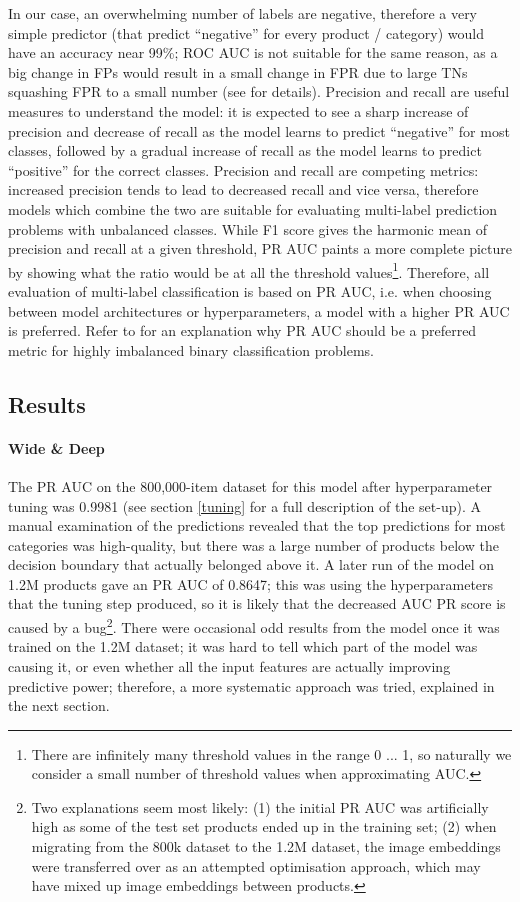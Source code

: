 In our case, an overwhelming number of labels are negative, therefore a very simple predictor (that predict ``negative'' for every product / category) would have an accuracy near 99\%; ROC AUC is not suitable for the same reason, as a big change in FPs would result in a small change in FPR due to large TNs squashing FPR to a small number (see \cite{prauc} for details).
Precision and recall are useful measures to understand the model: it is expected to see a sharp increase of precision and decrease of recall as the model learns to predict ``negative'' for most classes, followed by a gradual increase of recall as the model learns to predict ``positive'' for the correct classes.
Precision and recall are competing metrics: increased precision tends to lead to decreased recall and vice versa, therefore models which combine the two are suitable for evaluating multi-label prediction problems with unbalanced classes.
While F1 score gives the harmonic mean of precision and recall at a given threshold, PR AUC paints a more complete picture by showing what the ratio would be at all the threshold values\footnote{There are infinitely many threshold values in the range 0 ... 1, so naturally we consider a small number of threshold values when approximating AUC.}.
Therefore, all evaluation of multi-label classification is based on PR AUC, i.e. when choosing between model architectures or hyperparameters, a model with a higher PR AUC is preferred.
Refer to \cite{prauc} for an explanation why PR AUC should be a preferred metric for highly imbalanced binary classification problems.

\subsection{Results}


\paragraph{Wide \& Deep}
The PR AUC on the 800,000-item dataset for this model after hyperparameter tuning was 0.9981 (see section \ref{tuning} for a full description of the set-up).
A manual examination of the predictions revealed that the top predictions for most categories was high-quality, but there was a large number of products below the decision boundary that actually belonged above it.
A later run of the model on 1.2M products gave an PR AUC of 0.8647; this was using the hyperparameters that the tuning step produced, so it is likely that the decreased AUC PR score is caused by a bug\footnote{Two explanations seem most likely: (1) the initial PR AUC was artificially high as some of the test set products ended up in the training set; (2) when migrating from the 800k dataset to the 1.2M dataset, the image embeddings were transferred over as an attempted optimisation approach, which may have mixed up image embeddings between products.}.
There were occasional odd results from the model once it was trained on the 1.2M dataset; it was hard to tell which part of the model was causing it, or even whether all the input features are actually improving predictive power; therefore, a more systematic approach was tried, explained in the next section.


